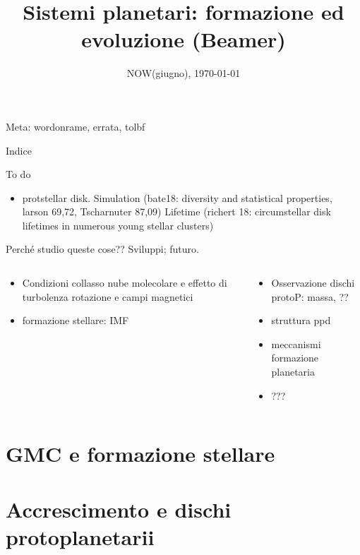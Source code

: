 \documentclass[10pt,xcolor={usenames},fleqn,mathserif,serif]{beamer}
\title{Sistemi planetari: formazione ed evoluzione (Beamer)}
\subtitle{}
\date{NOW(giugno), \today}
\begin{document}


\begin{frame}
  \titlepage
  Meta: wordonrame, errata, tolbf
\end{frame}


\begin{frame}[allowframebreaks]{Indice}
\tableofcontents[onlyparts]
\end{frame}

\begin{wordonframe}{To do}
\begin{itemize}
\item protstellar disk.
Simulation (bate18: diversity and statistical properties, larson 69,72, Tscharnuter 87,09)
Lifetime (richert 18: circumstellar disk lifetimes in numerous young stellar clusters)

\end{itemize}
\end{wordonframe}

\begin{wordonframe}{Perch\'e studio queste cose?? Sviluppi; futuro.}
\begin{columns}[T]\begin{column}{0.5\textwidth}
\begin{itemize}
\item Condizioni collasso nube molecolare e effetto di turbolenza rotazione e campi magnetici
\item formazione stellare: IMF
\end{itemize}
\end{column} \begin{column}{0.5\textwidth}
\begin{itemize}
\item Osservazione dischi protoP: massa, ??
\item struttura ppd
\item meccanismi formazione planetaria
\item ???
\end{itemize}
\end{column}  \end{columns}
\end{wordonframe}

\part{GMC e formazione stellare}
%

\part{Accrescimento e dischi protoplanetarii}

\end{document}
